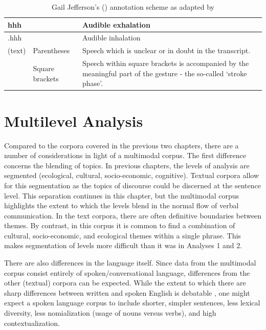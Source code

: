 \begin{table}[H]
\begin{footnotesize}
\begin{tabular}{ | P{2cm} P{3cm} P{6cm}|}
hhh             &                                & Audible exhalation                                                                                                 \\ \hline
.hhh            &                                & Audible inhalation                                                                                                 \\ \hline
(text)          & Parentheses                    & Speech which is unclear or in doubt in the transcript.                                                             \\ \hline
[text]          & Square brackets                & Speech within square brackets is accompanied by the meaningful part of the gesture - the so-called `stroke phase'. \\ \hline
\end{tabular}
\caption{Gail Jefferson's (\citeyear{Jefferson2004}) annotation scheme as adapted by \cite[5]{Beattie2016}}
\label{tab:table1}
\end{footnotesize}
\end{table}

\section{Multilevel Analysis}

Compared to the corpora covered in the previous two chapters, there are a number of considerations in light of a multimodal corpus. The first difference concerns the blending of topics. In previous chapters, the levels of analysis are segmented (ecological, cultural, socio-economic, cognitive). Textual corpora allow for this segmentation as the topics of discourse could be discerned at the sentence level. This separation continues in this chapter, but the multimodal corpus highlights the extent to which the levels blend in the normal flow of verbal communication. In the text corpora, there are often definitive boundaries between themes. By contrast, in this corpus it is common to find a combination of cultural, socio-economic, and ecological themes within a single phrase. This makes segmentation of levels more difficult than it was in Analyses 1 and 2. 

There are also differences in the language itself. Since data from the multimodal corpus consist entirely of spoken/conversational language, differences from the other (textual) corpora can be expected. While the extent to which there are sharp differences between written and spoken English is debatable \citep{Biber1988}, one might expect a spoken language corpus to include shorter, simpler sentences, less lexical diversity, less nomialization (usage of nouns versus verbs), and high contextualization.   

